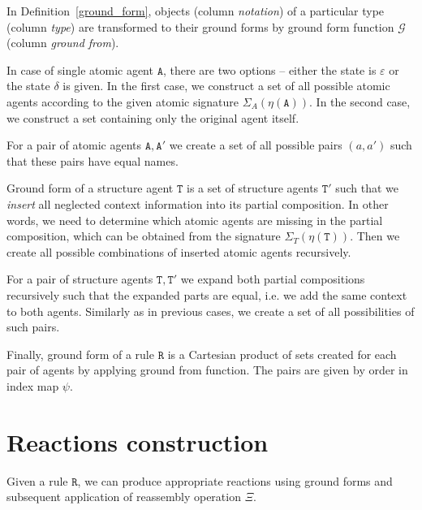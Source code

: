 \documentclass[12pt, twoside]{fithesis2} %
\begin{document}
In Definition~\ref{ground_form}, objects (column \emph{notation}) of a particular type (column \emph{type}) are transformed to their ground forms by ground form function $\mathcal{G}$ (column \emph{ground from}).

In case of single atomic agent $\mathtt{A}$, there are two options -- either the state is $\varepsilon$ or the state $\delta$ is given. In the first case, we construct a set of all possible atomic agents according to the given atomic signature $\Sigma_A(\eta(\mathtt{A}))$. In the second case, we construct a set containing only the original agent itself.

For a pair of atomic agents $\mathtt{A}, \mathtt{A}'$ we create a set of all possible pairs $(a, a')$ such that these pairs have equal names.

Ground form of a structure agent $\mathtt{T}$ is a set of structure agents $\mathtt{T}'$ such that we \emph{insert} all neglected context information into its partial composition. In other words, we need to determine which atomic agents are missing in the partial composition, which can be obtained from the signature $\Sigma_T(\eta(\mathtt{T}))$. Then we create all possible combinations of inserted atomic agents recursively.

For a pair of structure agents $\mathtt{T}, \mathtt{T}'$ we expand both partial compositions recursively such that the expanded parts are equal, i.e. we add the same context to both agents. Similarly as in previous cases, we create a set of all possibilities of such pairs.

Finally, ground form of a rule $\mathtt{R}$ is a Cartesian product of sets created for each pair of agents by applying ground from function. The pairs are given by order in index map $\psi$.

\section{Reactions construction}
\label{Generating reactions}

Given a rule $\mathtt{R}$, we can produce appropriate reactions using ground forms and subsequent application of reassembly operation $\Xi$.
\end{document}
